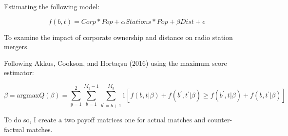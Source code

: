 \documentclass{article}
\begin{document}
Estimating the following model:

$$f(b, t) = Corp * Pop + \alpha Stations * Pop + \beta Dist  + \epsilon$$

To examine the impact of corporate ownership and distance on radio station mergers.

Following Akkus, Cookson, and Horta\c csu (2016) using the maximum score estimator:

$$\beta = \text{argmax} Q(\beta) = \sum_{y=1}^{2} \sum_{b = 1}^{M_y -1}\sum_{b^\prime = b+1}^{M_y} 1[f(b, t|\beta) + f(b^\prime, t^\prime|\beta) \geq f(b^\prime, t|\beta) + f(b, t^\prime|\beta)]$$

To do so, I create a two payoff matrices one for actual matches and counter-factual matches.
\end{document}
